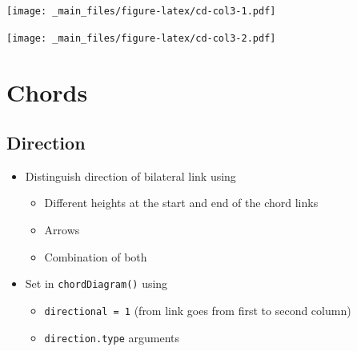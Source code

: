 \documentclass[
]{book}
\newenvironment{Shaded}{\begin{snugshade}}{\end{snugshade}}
\newcommand{\AttributeTok}[1]{\textcolor[rgb]{0.77,0.63,0.00}{#1}}
\newcommand{\FunctionTok}[1]{\textcolor[rgb]{0.00,0.00,0.00}{#1}}
\newcommand{\NormalTok}[1]{#1}
\newcommand{\SpecialCharTok}[1]{\textcolor[rgb]{0.00,0.00,0.00}{#1}}
\providecommand{\tightlist}{%
  \setlength{\itemsep}{0pt}\setlength{\parskip}{0pt}}
\begin{document}
\begin{Shaded}
\end{Shaded}

\texttt{[image: \_main\_files/figure-latex/cd-col3-1.pdf]}

\begin{Shaded}
\end{Shaded}

\texttt{[image: \_main\_files/figure-latex/cd-col3-2.pdf]}

\hypertarget{chords}{%
\section{Chords}\label{chords}}

\hypertarget{direction}{%
\subsection{Direction}\label{direction}}

\begin{itemize}
\tightlist
\item
  Distinguish direction of bilateral link using

  \begin{itemize}
  \tightlist
  \item
    Different heights at the start and end of the chord links
  \item
    Arrows
  \item
    Combination of both
  \end{itemize}
\item
  Set in \texttt{chordDiagram()} using

  \begin{itemize}
  \tightlist
  \item
    \texttt{directional\ =\ 1} (from link goes from first to second column)
  \item
    \texttt{direction.type} arguments
  \end{itemize}
\end{itemize}
\end{document}
